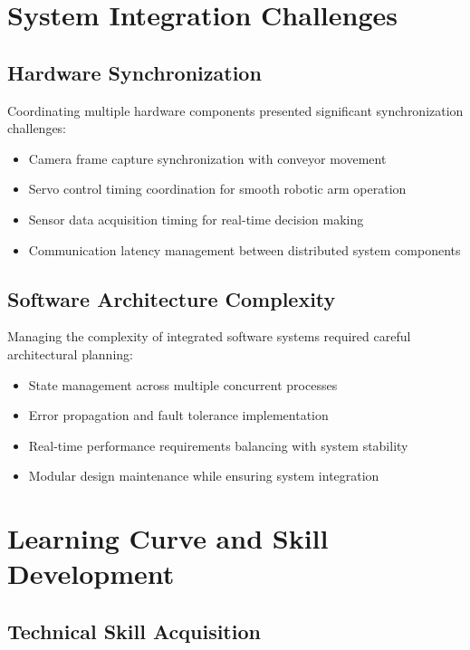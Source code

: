 \documentclass{book}
\begin{document}
\section{System Integration Challenges}

\subsection{Hardware Synchronization}

\par\noindent Coordinating multiple hardware components presented significant synchronization challenges:

\begin{itemize}
\item Camera frame capture synchronization with conveyor movement
\item Servo control timing coordination for smooth robotic arm operation
\item Sensor data acquisition timing for real-time decision making
\item Communication latency management between distributed system components
\end{itemize}

\subsection{Software Architecture Complexity}

\par\noindent Managing the complexity of integrated software systems required careful architectural planning:

\begin{itemize}
\item State management across multiple concurrent processes
\item Error propagation and fault tolerance implementation
\item Real-time performance requirements balancing with system stability
\item Modular design maintenance while ensuring system integration
\end{itemize}

\section{Learning Curve and Skill Development}

\subsection{Technical Skill Acquisition}
\end{document}
